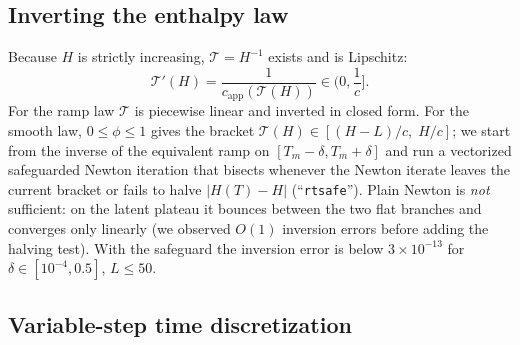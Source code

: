 \documentclass[11pt]{article}
\numberwithin{equation}{section}
\theoremstyle{remark}
\newcommand{\capp}{c_{\mathrm{app}}}
\begin{document}
\subsection{Inverting the enthalpy law}

Because $H$ is strictly increasing, $\mathcal T=H^{-1}$ exists and is
Lipschitz:
\begin{equation}
  \mathcal T'(H) = \frac{1}{\capp(\mathcal T(H))}\in\Big(0,\frac1c\Big].
  \label{eq:Tprime}
\end{equation}
For the ramp law $\mathcal T$ is piecewise linear and inverted in closed form.
For the smooth law, $0\le\phi\le1$ gives the bracket
$\mathcal T(H)\in[(H-L)/c,\;H/c]$; we start from the inverse of the equivalent
ramp on $[T_m-\delta,T_m+\delta]$ and run a vectorized safeguarded Newton
iteration that bisects whenever the Newton iterate leaves the current bracket
or fails to halve $|H(T)-H|$ (``\texttt{rtsafe}'').  Plain Newton is
\emph{not} sufficient: on the latent plateau it bounces between the two flat
branches and converges only linearly (we observed $O(1)$ inversion errors
before adding the halving test).  With the safeguard the inversion error is
below $3\times10^{-13}$ for $\delta\in[10^{-4},0.5]$, $L\le 50$.

\subsection{Variable-step time discretization}
\end{document}
